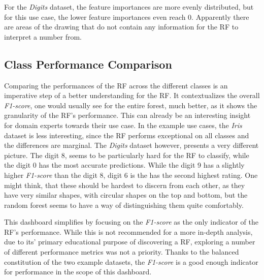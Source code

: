 \documentclass[a4paper, 12pt]{article}
\begin{document}
For the \textit{Digits} dataset, the feature importances are more evenly distributed, but for this use
case, the lower feature importances even reach 0. Apparently there are areas of the drawing that do not
contain any information for the RF to interpret a number from. \par

\subsection{Class Performance Comparison}
Comparing the performances of the RF across the different classes is an imperative step of a better
understanding for the RF. It contextualizes the overall \textit{F1-score}, one would usually see
for the entire forest, much better, as it shows the granularity of the RF's performance.
This can already be an interesting insight for domain experts towards their use case. In the example
use cases, the \textit{Iris} dataset is less interesting, since the RF performs exceptional on all
classes and the differences are marginal. The \textit{Digits} dataset however, presents a very different
picture. The digit 8, seems to be particularly hard for the RF to classify, while the digit 0 has the most
accurate predictions. While the digit 9 has a slightly higher \textit{F1-score} than the digit 8, digit 6
is the has the second highest rating. One might think, that these should be hardest to discern from each
other, as they have very similar shapes, with circular shapes on the top and bottom, but the random forest
seems to have a way of distinguishing them quite comfortably. \par

This dashboard simplifies by focusing on the \textit{F1-score} as the only indicator of the RF's
performance. While this is not recommended for a more in-depth analysis, due to its' primary educational
purpose of discovering a RF, exploring a number of different performance metrics was not a priority.
Thanks to the balanced constitution of the two example datasets, the \textit{F1-score} is a good enough
indicator for performance in the scope of this dashboard. \par
\end{document}
